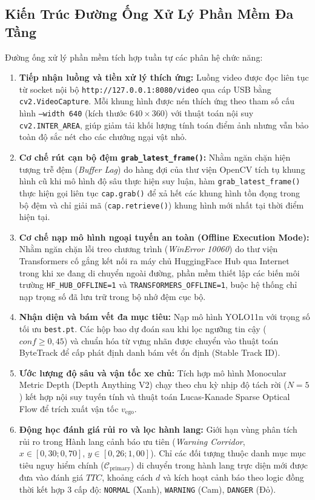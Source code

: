 \documentclass[12pt,a4paper]{article}
\begin{document}
\subsection{Kiến Trúc Đường Ống Xử Lý Phần Mềm Đa Tầng}
Đường ống xử lý phần mềm tích hợp tuần tự các phân hệ chức năng:
\begin{enumerate}
    \item \textbf{Tiếp nhận luồng và tiền xử lý thích ứng:} Luồng video được đọc liên tục từ socket nội bộ \texttt{http://127.0.0.1:8080/video} qua cáp USB bằng \texttt{cv2.VideoCapture}. Mỗi khung hình được nén thích ứng theo tham số cấu hình \texttt{--width 640} (kích thước $640 \times 360$) với thuật toán nội suy \texttt{cv2.INTER\_AREA}, giúp giảm tải khối lượng tính toán điểm ảnh nhưng vẫn bảo toàn độ sắc nét cho các chướng ngại vật nhỏ.
    \item \textbf{Cơ chế rút cạn bộ đệm \texttt{grab\_latest\_frame()}:} Nhằm ngăn chặn hiện tượng trễ đệm (\textit{Buffer Lag}) do hàng đợi của thư viện OpenCV tích tụ khung hình cũ khi mô hình độ sâu thực hiện suy luận, hàm \texttt{grab\_latest\_frame()} thực hiện gọi liên tục \texttt{cap.grab()} để xả hết các khung hình tồn đọng trong bộ đệm và chỉ giải mã (\texttt{cap.retrieve()}) khung hình mới nhất tại thời điểm hiện tại.
    \item \textbf{Cơ chế nạp mô hình ngoại tuyến an toàn (Offline Execution Mode):} Nhằm ngăn chặn lỗi treo chương trình (\textit{WinError 10060}) do thư viện Transformers cố gắng kết nối ra máy chủ HuggingFace Hub qua Internet trong khi xe đang di chuyển ngoài đường, phần mềm thiết lập các biến môi trường \texttt{HF\_HUB\_OFFLINE=1} và \texttt{TRANSFORMERS\_OFFLINE=1}, buộc hệ thống chỉ nạp trọng số đã lưu trữ trong bộ nhớ đệm cục bộ.
    \item \textbf{Nhận diện và bám vết đa mục tiêu:} Nạp mô hình YOLO11n với trọng số tối ưu \texttt{best.pt}. Các hộp bao dự đoán sau khi lọc ngưỡng tin cậy ($conf \ge 0,45$) và chuẩn hóa từ vựng nhãn được chuyển vào thuật toán ByteTrack để cấp phát định danh bám vết ổn định (Stable Track ID).
    \item \textbf{Ước lượng độ sâu và vận tốc xe chủ:} Tích hợp mô hình Monocular Metric Depth (Depth Anything V2) chạy theo chu kỳ nhịp độ tách rời ($N=5$) kết hợp nội suy tuyến tính và thuật toán Lucas-Kanade Sparse Optical Flow để trích xuất vận tốc $v_{\text{ego}}$.
    \item \textbf{Động học đánh giá rủi ro và lọc hành lang:} Giới hạn vùng phân tích rủi ro trong Hành lang cảnh báo ưu tiên (\textit{Warning Corridor}, $x \in [0,30; 0,70]$, $y \in [0,26; 1,00]$). Chỉ các đối tượng thuộc danh mục mục tiêu nguy hiểm chính ($\mathcal{C}_{\text{primary}}$) di chuyển trong hành lang trực diện mới được đưa vào đánh giá $TTC$, khoảng cách $d$ và kích hoạt cảnh báo theo logic đồng thời kết hợp 3 cấp độ: \texttt{NORMAL} (Xanh), \texttt{WARNING} (Cam), \texttt{DANGER} (Đỏ).

\end{enumerate}
\end{document}

